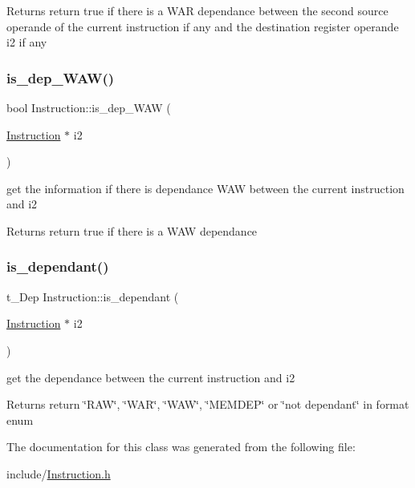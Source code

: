 \begin{DoxyReturn}{Returns}
return true if there is a W\+AR dependance between the second source operande of the current instruction if any and the destination register operande i2 if any 
\end{DoxyReturn}
\mbox{\label{class_instruction_a30c159faa5c462bb2c7ae7562c9c8254}} 
\subsubsection{\texorpdfstring{is\+\_\+dep\+\_\+\+W\+A\+W()}{is\_dep\_WAW()}}
{\footnotesize\ttfamily bool Instruction\+::is\+\_\+dep\+\_\+\+W\+AW (\begin{DoxyParamCaption}\item[{\mbox{\hyperlink{class_instruction}{Instruction}} $\ast$}]{i2 }\end{DoxyParamCaption})}



get the information if there is dependance W\+AW between the current instruction and i2 ~\newline
 

\begin{DoxyReturn}{Returns}
return true if there is a W\+AW dependance 
\end{DoxyReturn}
\mbox{\label{class_instruction_ac8d86b800140a08cb03d82f83f363fa4}} 
\subsubsection{\texorpdfstring{is\+\_\+dependant()}{is\_dependant()}}
{\footnotesize\ttfamily t\+\_\+\+Dep Instruction\+::is\+\_\+dependant (\begin{DoxyParamCaption}\item[{\mbox{\hyperlink{class_instruction}{Instruction}} $\ast$}]{i2 }\end{DoxyParamCaption})}



get the dependance between the current instruction and i2 

\begin{DoxyReturn}{Returns}
return \char`\"{}\+R\+A\+W\char`\"{}, \char`\"{}\+W\+A\+R\char`\"{}, \char`\"{}\+W\+A\+W\char`\"{}, \char`\"{}\+M\+E\+M\+D\+E\+P\char`\"{} or \char`\"{}not dependant\char`\"{} in format enum 
\end{DoxyReturn}


The documentation for this class was generated from the following file\+:\begin{DoxyCompactItemize}
\item 
include/\mbox{\hyperlink{_instruction_8h}{Instruction.\+h}}\end{DoxyCompactItemize}
